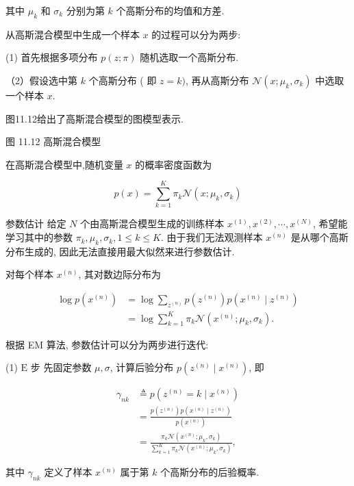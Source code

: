 \documentclass[10pt]{article}
\begin{document}
其中 $\mu_{k}$ 和 $\sigma_{k}$ 分别为第 $k$ 个高斯分布的均值和方差.

从高斯混合模型中生成一个样本 $x$ 的过程可以分为两步:

(1) 首先根据多项分布 $p(z ; \pi)$ 随机选取一个高斯分布.

（2）假设选中第 $k$ 个高斯分布 ( 即 $z=k)$, 再从高斯分布 $\mathcal{N}\left(x ; \mu_{k}, \sigma_{k}\right)$ 中选取一个样本 $x$.

图11.12给出了高斯混合模型的图模型表示.



图 11.12 高斯混合模型

在高斯混合模型中,随机变量 $x$ 的概率密度函数为


\begin{equation*}
p(x)=\sum_{k=1}^{K} \pi_{k} \mathcal{N}\left(x ; \mu_{k}, \sigma_{k}\right) \tag{11.53}
\end{equation*}


参数估计 给定 $N$ 个由高斯混合模型生成的训练样本 $x^{(1)}, x^{(2)}, \cdots, x^{(N)}$, 希望能学习其中的参数 $\pi_{k}, \mu_{k}, \sigma_{k}, 1 \leq k \leq K$. 由于我们无法观测样本 $x^{(n)}$ 是从哪个高斯分布生成的, 因此无法直接用最大似然来进行参数估计.

对每个样本 $x^{(n)}$, 其对数边际分布为


\begin{align*}
\log p\left(x^{(n)}\right) & =\log \sum_{z^{(n)}} p\left(z^{(n)}\right) p\left(x^{(n)} \mid z^{(n)}\right)  \tag{11.54}\\
& =\log \sum_{k=1}^{K} \pi_{k} \mathcal{N}\left(x^{(n)} ; \mu_{k}, \sigma_{k}\right) . \tag{11.55}
\end{align*}


根据 EM 算法, 参数估计可以分为两步进行迭代:

(1) $\mathrm{E}$ 步 先固定参数 $\mu, \sigma$, 计算后验分布 $p\left(z^{(n)} \mid x^{(n)}\right)$, 即


\begin{align*}
\gamma_{n k} & \triangleq p\left(z^{(n)}=k \mid x^{(n)}\right)  \tag{11.56}\\
& =\frac{p\left(z^{(n)}\right) p\left(x^{(n)} \mid z^{(n)}\right)}{p\left(x^{(n)}\right)}  \tag{11.57}\\
& =\frac{\pi_{k} \mathcal{N}\left(x^{(n)} ; \mu_{k}, \sigma_{k}\right)}{\sum_{k=1}^{K} \pi_{k} \mathcal{N}\left(x^{(n)} ; \mu_{k}, \sigma_{k}\right)}, \tag{11.58}
\end{align*}


其中 $\gamma_{n k}$ 定义了样本 $x^{(n)}$ 属于第 $k$ 个高斯分布的后验概率.
\end{document}
